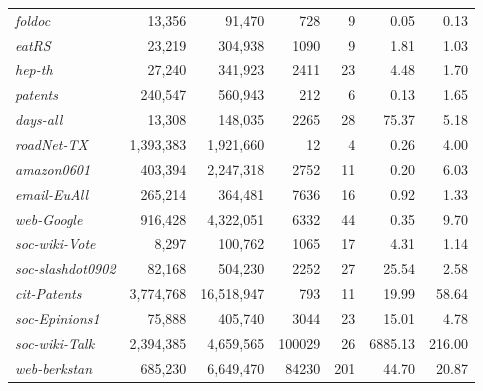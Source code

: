 \begin{table}[!hbt]
\begin{tabular}{lrrrr|rr}
{\it foldoc}	&	13,356	&	91,470	&	728	&	9	&	0.05	&	0.13	\\
{\it eatRS}	&	23,219	&	304,938	&	1090	&	9	&	1.81	&	1.03	\\
{\it hep-th}	&	27,240	&	341,923	&	2411	&	23	&	4.48	&	1.70	\\
{\it patents}	&	240,547	&	560,943	&	212	&	6	&	0.13	&	1.65	\\
{\it days-all}	&	13,308	&	148,035	&	2265	&	28	&	75.37	&	5.18	\\
\midrule
{\it roadNet-TX}	&	1,393,383	&	1,921,660	&	12	&	4	&	0.26	&	4.00	\\
{\it amazon0601}	&	403,394	&	2,247,318	&	2752	&	11	&	0.20	&	6.03	\\
{\it email-EuAll}	&	265,214	&	364,481	&	7636	&	16	&	0.92	&	1.33	\\
{\it web-Google}	&	916,428	&	4,322,051	&	6332	&	44	&	0.35	&	9.70	\\
{\it soc-wiki-Vote}	&	8,297	&	100,762	&	1065	&	17	&	4.31	&	1.14	\\
{\it soc-slashdot0902}	&	82,168	&	504,230	&	2252	&	27	&	25.54	&	2.58	\\
{\it cit-Patents}	&	3,774,768	&	16,518,947	&	793	&	11	&	19.99	&	58.64	\\
{\it soc-Epinions1}	&	75,888	&	405,740	&	3044	&	23	&	15.01	&	4.78	\\
{\it soc-wiki-Talk}	&	2,394,385	&	4,659,565	&	100029	&	26	&	6885.13	&	216.00	\\
{\it web-berkstan}	&	685,230	&	6,649,470	&	84230	&	201	&	44.70	&	20.87	\\
\bottomrule\bottomrule
\end{tabular}
\end{table}
